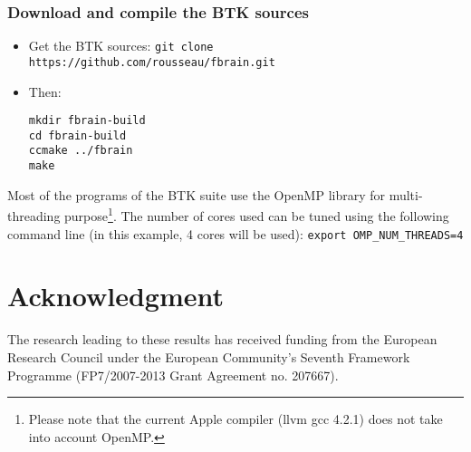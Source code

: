 \documentclass[a4paper,10pt]{article}
\begin{document}
\subsubsection{Download and compile the BTK sources}
\begin{itemize}
 \item Get the BTK sources: \texttt{git clone https://github.com/rousseau/fbrain.git }
 \item Then:
\begin{verbatim}
mkdir fbrain-build
cd fbrain-build
ccmake ../fbrain
make
\end{verbatim}
\end{itemize}

Most of the programs of the BTK suite use the OpenMP library for multi-threading
purpose\footnote{Please note that the current Apple compiler (llvm gcc 4.2.1) does not take into account OpenMP.}. The number of cores used can be tuned using the following command line
(in this example, 4 cores will be used): \texttt{export OMP\_NUM\_THREADS=4}




\section*{Acknowledgment}
\small{The research leading to these results has received funding from the
European Research Council under the European Community’s Seventh Framework
Programme (FP7/2007-2013 Grant Agreement no. 207667).}



\end{document}
